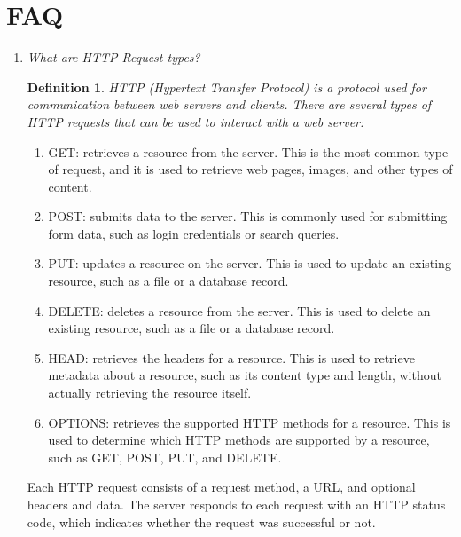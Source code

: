 \documentclass[11pt]{article}
\newtheorem{dfn}[thm]{Definition}
\begin{document}
\section{FAQ}
\begin{enumerate}
    \item \textit{What are HTTP Request types?}\\

          \begin{dfn}
              HTTP (Hypertext Transfer Protocol) is a protocol used for communication between web servers and clients. There are several types of HTTP requests that can be used to interact with a web server:
          \end{dfn}

          \begin{enumerate}
              \item GET: retrieves a resource from the server. This is the most common type of request, and it is used to retrieve web pages, images, and other types of content.
              \item POST: submits data to the server. This is commonly used for submitting form data, such as login credentials or search queries.
              \item PUT: updates a resource on the server. This is used to update an existing resource, such as a file or a database record.
              \item DELETE: deletes a resource from the server. This is used to delete an existing resource, such as a file or a database record.
              \item HEAD: retrieves the headers for a resource. This is used to retrieve metadata about a resource, such as its content type and length, without actually retrieving the resource itself.
              \item OPTIONS: retrieves the supported HTTP methods for a resource. This is used to determine which HTTP methods are supported by a resource, such as GET, POST, PUT, and DELETE.
          \end{enumerate}
          Each HTTP request consists of a request method, a URL, and optional headers and data. The server responds to each request with an HTTP status code, which indicates whether the request was successful or not.


\end{enumerate}
\end{document}
